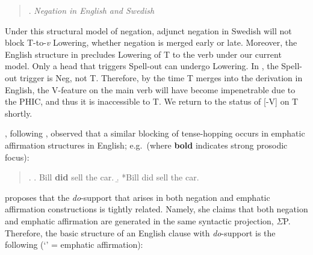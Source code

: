 \begin{minipage}{5.5in}
\begin{quote}
\ex. {\it Negation in English and Swedish}

\qtreecentertrue
\end{quote}
\end{minipage}
\onehalfspacing
Under this structural model of negation, adjunct negation in Swedish \Last[b] will not block T-to-{\it v} Lowering, whether negation is merged early or late. Moreover, the English structure in \Last[a] precludes Lowering of T to the verb under our current model. Only a head that triggers Spell-out can undergo Lowering. In \Last[a], the Spell-out trigger is Neg, not T. Therefore, by the time T merges into the derivation in English, the V-feature on the main verb will have become impenetrable due to the PHIC, and thus it is inaccessible to T. We return to the status of [-V] on T shortly.

\citet{laka1990}, following \citet{chomsky1957}, observed that a similar blocking of tense-hopping occurs in emphatic affirmation structures in English; e.g.\ (where {\bf bold} indicates strong prosodic focus):

\singlespacing
\begin{quote} 
\ex.
\a. Bill \textbf{did} sell the car.
\b. *Bill did sell the car.

\end{quote}
\onehalfspacing
\citeauthor{laka1990} proposes that the {\it do}-support that arises in both negation and emphatic affirmation constructions is tightly related. Namely, she claims that both negation and emphatic affirmation are generated in the same syntactic projection, $\Sigma$P. Therefore, the basic structure of an English clause with {\it do}-support is the following (`\mbox{}' = emphatic affirmation):

